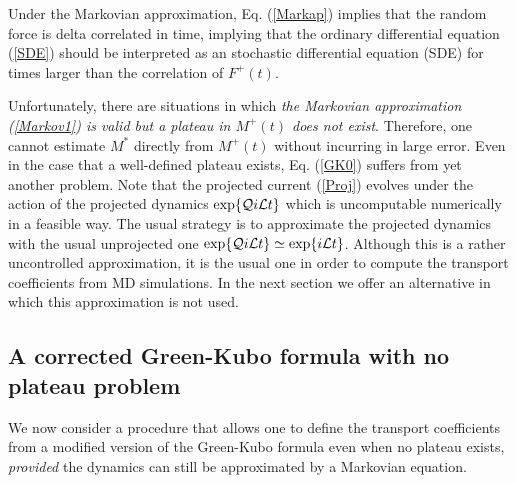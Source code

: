 \documentclass[a4paper,openright,12pt]{book}
\begin{document}
Under the  Markovian approximation,  Eq.  (\ref{Markap})  implies that
the  random force  is  delta  correlated in  time,  implying that  the
ordinary differential equation (\ref{SDE}) should be interpreted as an
stochastic  differential  equation (SDE)  for  times  larger than  the
correlation of $F^+(t)$.


Unfortunately,  there are  situations  in  which \textit{the  Markovian
approximation (\ref{Markov1}) is valid but  a plateau in $M^+(t)$ does
not  exist}.  Therefore,  one  cannot estimate  $M^*$ directly  from
$M^+(t)$ without  incurring in  large error.   Even in  the case  that a
well-defined plateau exists, Eq.  (\ref{GK0}) suffers from yet another
problem.  Note  that the projected current  (\ref{Proj}) evolves under
the  action of  the  projected dynamics  $\exp\{{\cal Q}i{\cal  L}t\}$
which  is  uncomputable numerically  in  a  feasible way.   The  usual
strategy  is to  approximate  the projected  dynamics  with the  usual
unprojected one $\exp\{{\cal Q}i{\cal L}t\}\simeq \exp\{i{\cal L}t\}$.
Although this is a rather  uncontrolled approximation, it is the usual
one  in   order  to  compute   the  transport  coefficients   from  MD
simulations. In the next section we offer an alternative in which this approximation
is not used.



\subsection{A corrected Green-Kubo formula with no plateau problem}
We now  consider a procedure that  allows one to define  the transport
coefficients from  a modified version  of the Green-Kubo  formula even
when no  plateau exists, \textit{provided}  the dynamics can  still be
approximated by a Markovian equation.
\end{document}
